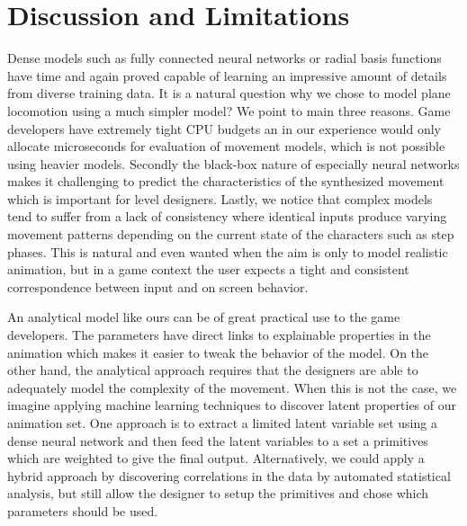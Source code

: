 \section{Discussion and Limitations}

Dense models such as fully connected neural networks or radial basis functions have time and again proved capable of learning an impressive amount of details from diverse training data. It is a natural question why we chose to model plane locomotion using a much simpler model? We point to main three reasons. Game developers have extremely tight CPU budgets an in our experience would only allocate microseconds for evaluation of movement models, which is not possible using heavier models. Secondly the black-box nature of especially neural networks makes it challenging to predict the characteristics of the synthesized movement which is important for level designers.  Lastly, we notice that complex models tend to suffer from a lack of consistency where identical inputs produce varying movement patterns depending on the current state of the characters such as step phases. This is natural and even wanted when the aim is only to model realistic animation, but in a game context the user expects a tight and consistent correspondence between input and on screen behavior. 

An analytical model like ours can be of great practical use to the game developers. The parameters have direct links to explainable properties in the animation which makes it easier to tweak the behavior of the model. On the other hand, the analytical approach requires that the designers are able to adequately model the complexity of the movement. 
%
When this is not the case, we imagine applying machine learning techniques to discover latent properties of our animation set. %
One approach is to extract a limited latent variable set using a dense neural network and then feed the latent variables to a set a primitives which are weighted to give the final output. 
Alternatively, we could apply a hybrid approach by discovering correlations in the data by automated statistical analysis, but still allow the designer to setup the primitives and chose which parameters should be used. 

